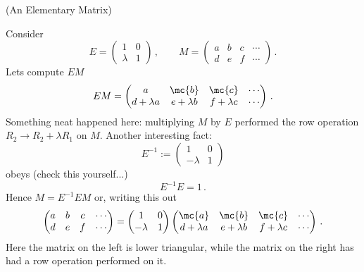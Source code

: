 \begin{example} (An Elementary Matrix)

\noindent
Consider $$E=\begin{pmatrix}1&0\\\lambda&1\end{pmatrix}\, ,\qquad M=\begin{pmatrix}a&b&c&\cdots\\d&e&f&\cdots\end{pmatrix}\, .$$
Lets compute $EM$
$$
EM=\begin{pmatrix}\multicolumn{1}{c}{a}&\mc{b}&\mc{c}&\cdots\\d+\lambda a&e+\lambda b&f+\lambda c&\cdots\end{pmatrix}\, .
$$
Something neat happened here: multiplying $M$ by $E$ performed the row operation $R_2\to R_2+\lambda R_1$ on $M$.
Another interesting fact:
$$
E^{-1}:=\begin{pmatrix}1&0\\-\lambda&1\end{pmatrix}
$$ 
obeys (check this yourself...)
$$
E^{-1} E = 1\, .
$$
Hence $M=E^{-1} E M$ or, writing this out
$$
\begin{pmatrix}a&b&c&\cdots\\d&e&f&\cdots\end{pmatrix}=\begin{pmatrix}1&0\\-\lambda&1\end{pmatrix} \begin{pmatrix}\mc{a}&\mc{b}&\mc{c}&\cdots\\d+\lambda a&e+\lambda b&f+\lambda c&\cdots\end{pmatrix}\, .
$$
Here the matrix on the left is lower triangular, while the matrix on the right has had a row operation performed on it.
\end{example}




